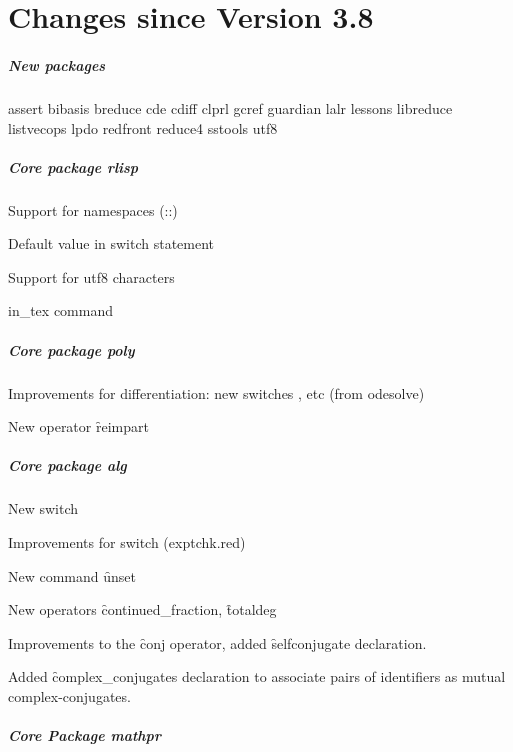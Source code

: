 \chapter{Changes since Version 3.8}

\paragraph*{New packages}

assert
bibasis
breduce
cde
cdiff
clprl
gcref
guardian
lalr
lessons
libreduce
listvecops
lpdo
redfront
reduce4
sstools
utf8

\paragraph*{Core package rlisp}

Support for namespaces (::)

Default value in switch statement

Support for utf8 characters

in\_tex command

\paragraph*{Core package poly}

Improvements for differentiation: new switches ,  etc
(from odesolve)

New operator \f{reimpart}

\paragraph*{Core package alg}

New switch 

Improvements for switch  (exptchk.red)

New command \f{unset}

New operators \f{continued\_fraction}, \f{totaldeg}

Improvements to the \f{conj} operator, added \f{selfconjugate} declaration.

Added \f{complex\_conjugates} declaration to associate pairs of identifiers
as mutual complex-conjugates.

\paragraph*{Core Package mathpr}

